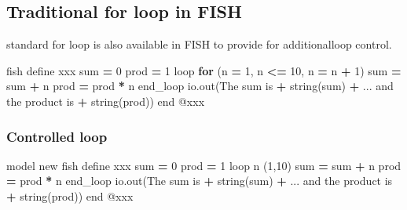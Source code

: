 \documentclass[a4paper, nobind]{templates/ociamthesis}
\newenvironment{Shaded}{\begin{snugshade}}{\end{snugshade}}
\newcommand{\AttributeTok}[1]{\textcolor[rgb]{0.77,0.63,0.00}{#1}}
\newcommand{\BuiltInTok}[1]{#1}
\newcommand{\ControlFlowTok}[1]{\textcolor[rgb]{0.13,0.29,0.53}{\textbf{#1}}}
\newcommand{\DecValTok}[1]{\textcolor[rgb]{0.00,0.00,0.81}{#1}}
\newcommand{\NormalTok}[1]{#1}
\newcommand{\OperatorTok}[1]{\textcolor[rgb]{0.81,0.36,0.00}{\textbf{#1}}}
\newcommand{\StringTok}[1]{\textcolor[rgb]{0.31,0.60,0.02}{#1}}
\renewenvironment{Shaded}
{
  \vspace{10pt}%
  \begin{snugshade}%
}{%
  \end{snugshade}%
  \vspace{8pt}%
}
\begin{document}
\hypertarget{traditional-for-loop-in-fish}{%
\subsection{Traditional for loop in FISH}\label{traditional-for-loop-in-fish}}

standard for loop is also available in FISH to provide for additionalloop control.

\begin{Shaded}
\begin{Highlighting}[]
\NormalTok{fish define xxx}
    \BuiltInTok{sum}  \OperatorTok{=} \DecValTok{0}
\NormalTok{    prod }\OperatorTok{=} \DecValTok{1}
\NormalTok{    loop }\ControlFlowTok{for}\NormalTok{ (n }\OperatorTok{=} \DecValTok{1}\NormalTok{, n }\OperatorTok{\textless{}=} \DecValTok{10}\NormalTok{, n }\OperatorTok{=}\NormalTok{ n }\OperatorTok{+} \DecValTok{1}\NormalTok{)}
        \BuiltInTok{sum}  \OperatorTok{=} \BuiltInTok{sum}  \OperatorTok{+}\NormalTok{ n}
\NormalTok{        prod }\OperatorTok{=}\NormalTok{ prod }\OperatorTok{*}\NormalTok{ n}
\NormalTok{    end\_loop}
\NormalTok{    io.out(}\StringTok{\textquotesingle{}The sum is \textquotesingle{}} \OperatorTok{+}\NormalTok{ string(}\BuiltInTok{sum}\NormalTok{) }\OperatorTok{+}\NormalTok{ ... }
           \StringTok{\textquotesingle{} and the product is \textquotesingle{}} \OperatorTok{+}\NormalTok{ string(prod))}
\NormalTok{end}
\AttributeTok{@xxx}
\end{Highlighting}
\end{Shaded}

\hypertarget{controlled-loop}{%
\subsubsection{Controlled loop}\label{controlled-loop}}

\begin{Shaded}
\begin{Highlighting}[]
\NormalTok{model new}
\NormalTok{fish define xxx}
    \BuiltInTok{sum}  \OperatorTok{=} \DecValTok{0}
\NormalTok{    prod }\OperatorTok{=} \DecValTok{1}
\NormalTok{    loop n (}\DecValTok{1}\NormalTok{,}\DecValTok{10}\NormalTok{)}
        \BuiltInTok{sum}  \OperatorTok{=} \BuiltInTok{sum}  \OperatorTok{+}\NormalTok{ n}
\NormalTok{        prod }\OperatorTok{=}\NormalTok{ prod }\OperatorTok{*}\NormalTok{ n}
\NormalTok{    end\_loop}
\NormalTok{    io.out(}\StringTok{\textquotesingle{}The sum is \textquotesingle{}} \OperatorTok{+}\NormalTok{ string(}\BuiltInTok{sum}\NormalTok{) }\OperatorTok{+}\NormalTok{  ...}
           \StringTok{\textquotesingle{} and the product is \textquotesingle{}} \OperatorTok{+}\NormalTok{ string(prod))}
\NormalTok{end}
\AttributeTok{@xxx}
\end{Highlighting}
\end{Shaded}
\end{document}
